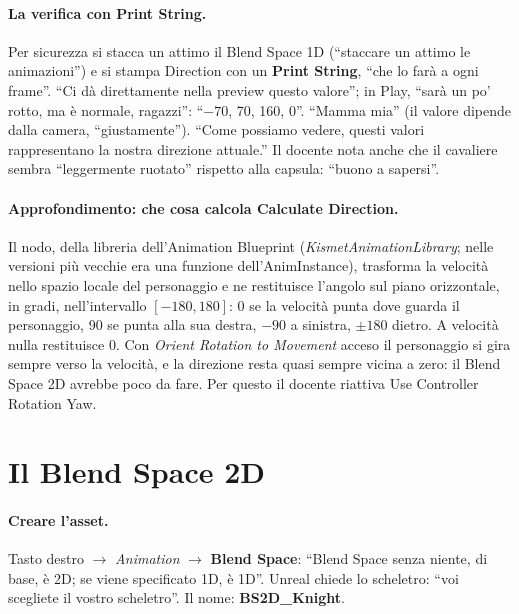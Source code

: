 \paragraph{La verifica con Print String.} Per sicurezza si stacca un attimo il Blend Space
1D (``staccare un attimo le animazioni'') e si stampa Direction con un \textbf{Print
String}, ``che lo farà a ogni frame''. ``Ci dà direttamente nella preview questo valore'';
in Play, ``sarà un po' rotto, ma è normale, ragazzi'': ``$-70$, 70, 160, 0''. ``Mamma mia''
(il valore dipende dalla camera, ``giustamente''). ``Come possiamo vedere, questi valori
rappresentano la nostra direzione attuale.'' Il docente nota anche che il cavaliere
sembra ``leggermente ruotato'' rispetto alla capsula: ``buono a sapersi''.

\paragraph{Approfondimento: che cosa calcola Calculate Direction.} Il nodo, della
libreria dell'Animation Blueprint (\emph{KismetAnimationLibrary}; nelle versioni più
vecchie era una funzione dell'AnimInstance), trasforma la velocità nello spazio locale
del personaggio e ne restituisce l'angolo sul piano orizzontale, in gradi, nell'intervallo
$[-180, 180]$: 0 se la velocità punta dove guarda il personaggio, 90 se punta alla sua
destra, $-90$ a sinistra, $\pm 180$ dietro. A velocità nulla restituisce 0. Con
\emph{Orient Rotation to Movement} acceso il personaggio si gira sempre verso la
velocità, e la direzione resta quasi sempre vicina a zero: il Blend Space 2D avrebbe poco
da fare. Per questo il docente riattiva Use Controller Rotation Yaw.

\section{Il Blend Space 2D}
\label{ue9:sec:blend2d}

\paragraph{Creare l'asset.} Tasto destro $\rightarrow$ \emph{Animation} $\rightarrow$
\textbf{Blend Space}: ``Blend Space senza niente, di base, è 2D; se viene specificato
1D, è 1D''. Unreal chiede lo scheletro: ``voi scegliete il vostro scheletro''. Il nome:
\textbf{BS2D\_Knight}.

